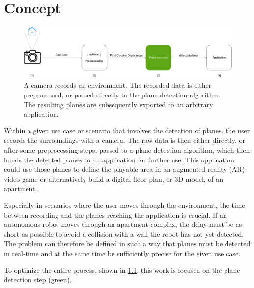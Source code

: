 \documentclass[main.tex]{subfiles}
\begin{document}
\chapter{Concept} \label{chap:Concept}


\begin{figure}[!ht]
    \centering
    \includegraphics[width=15 cm]{images/concept.png}
    \caption[Concept Graphic]{A camera records an environment. The recorded data is either preprocessed, or passed directly to the plane detection algorithm.
        The resulting planes are subsequently exported to an arbitrary application.}
    \label{fig:concept}
\end{figure}



Within a given use case or scenario that involves the detection of planes, the user records the surroundings with a camera. The raw data is then either
directly, or after some preprocessing steps, passed to a plane detection algorithm, which then hands the detected planes to an application for further use.
This application could use those planes to define the playable area in an augmented reality (AR) video game or alternatively build a digital floor
plan, or 3D model, of an apartment.

Especially in scenarios where the user moves through the environment, the time between recording and the planes reaching the application is crucial.
If an autonomous robot moves through an apartment complex, the delay must be as short as possible to avoid a collision with a wall the robot has not yet detected.
The problem can therefore be defined in such a way that planes must be detected in real-time and at the same time be sufficiently precise for the given use case.

To optimize the entire process, shown in \ref{fig:concept}, this work is focused on the plane detection step (green).
\end{document}
